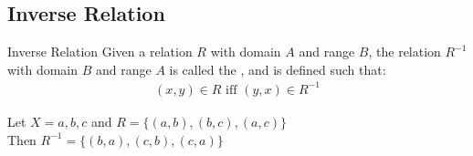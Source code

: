 \documentclass[\main/notes.tex]{subfiles}
\begin{document}
			\subsection{Inverse Relation}
				\begin{definition}{Inverse Relation}
					Given a relation $R$ with domain $A$ and range $B$, the relation $R^{-1}$ with domain $B$ and range $A$ is called the , and is defined such that:
					\begin{align*}
						(x, y) \in R \text{ iff } (y, x) \in R^{-1}
					\end{align*}
				\end{definition}
				\begin{example}[width=0.6\textwidth]
					Let $X = {a, b, c}$ and $R = \bigl\{(a, b), (b, c), (a, c)\bigr\}$\\
					Then $R^{-1} = \bigl\{(b, a), (c, b), (c, a)\bigr\}$
				\end{example}
\end{document}
